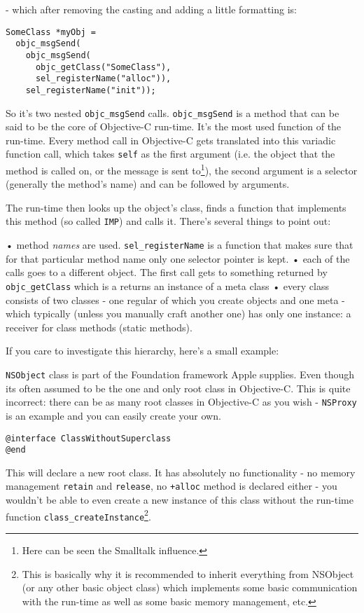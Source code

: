\documentclass[a4paper, 11pt, fleqn]{book}
\begin{document}
- which after removing the casting and adding a little formatting is:

\begin{verbatim}SomeClass *myObj = 
  objc_msgSend(
    objc_msgSend(
      objc_getClass("SomeClass"),  
      sel_registerName("alloc")), 
    sel_registerName("init"));
\end{verbatim}

So it's two nested \verb=objc_msgSend= calls. \verb=objc_msgSend= is a method that can be said to be the core of Objective-C run-time. It's the most used function of the run-time. Every method call in Objective-C gets translated into this variadic function call, which takes \verb=self= as the first argument (i.e. the object that the method is called on, or the message is sent to\footnote{Here can be seen the Smalltalk influence.}), the second argument is a selector (generally the method's name) and can be followed by arguments.

The run-time then looks up the object's class, finds a function that implements this method (so called \verb=IMP=) and calls it. There's several things to point out:

• method \emph{names} are used. \verb=sel_registerName= is a function that makes sure that for that particular method name only one selector pointer is kept.
• each of the calls goes to a different object. The first call gets to something returned by \verb=objc_getClass= which is a returns an instance of a meta class
• every class consists of two classes - one regular of which you create objects and one meta - which typically (unless you manually craft another one) has only one instance: a receiver for class methods (static methods).

If you care to investigate this hierarchy, here's a small example:

\verb=NSObject= class is part of the Foundation framework Apple supplies. Even though its often assumed to be the one and only root class in Objective-C. This is quite incorrect: there can be as many root classes in Objective-C as you wish - \verb=NSProxy= is an example and you can easily create your own.

\begin{verbatim}@interface ClassWithoutSuperclass
@end\end{verbatim}

This will declare a new root class. It has absolutely no functionality - no memory management \verb=retain= and \verb=release=, no \verb=+alloc= method is declared either - you wouldn't be able to even create a new instance of this class without the run-time function \verb=class_createInstance=\footnote{This is basically why it is recommended to inherit everything from NSObject (or any other basic object class) which implements some basic communication with the run-time as well as some basic memory management, etc.}.
\end{document}
